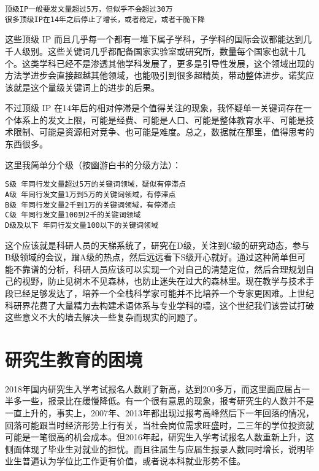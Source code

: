 \documentclass[]{tufte-book}
\begin{document}
\begin{verbatim}
顶级IP一般要发文量超过5万，但似乎不会超过30万
很多顶级IP在14年之后停止了增长，或者稳定，或者干脆下降
\end{verbatim}

这些顶级 IP 而且几乎每一个都有一堆下属子学科，子学科的国际会议都能达到几千人级别。这些关键词几乎都配备国家实验室或研究所，数量每个国家也就十几个。这类学科已经不是渗透其他学科发展了，更多是引导性发展，这个领域出现的方法学进步会直接超越其他领域，也能吸引到很多超精英，带动整体进步。诺奖应该就是这个量级关键词上的进步的后果。

不过顶级 IP 在14年后的相对停滞是个值得关注的现象，我怀疑单一关键词存在一个体系上的发文上限，可能是经费、可能是人口、可能是整体教育水平、可能是技术限制、可能是资源相对竞争、也可能是难度。总之，数据就在那里，值得思考的东西很多。

这里我简单分个级（按幽游白书的分级方法）：

\begin{verbatim}
S级 年同行发文量超过5万的关键词领域，疑似有停滞点
A级 年同行发文量1万到5万的关键词领域，有停滞点
B级 年同行发文量2千到1万的关键词领域，有停滞点
C级 年同行发文量100到2千的关键词领域
D级及以下 年同行发文量100以下的关键词领域
\end{verbatim}

这个应该就是科研人员的天梯系统了，研究在D级，关注到C级的研究动态，参与B级领域的会议，蹭A级的热点，然后远远看下S级开心就好。通过这种简单但可能不靠谱的分析，科研人员应该可以实现一个对自己的清楚定位，然后合理规划自己的视野，防止见树木不见森林，也防止迷失在过大的森林里。现在教学与技术手段已经足够发达了，培养一个全栈科学家可能并不比培养一个专家更困难。上世纪科研界花费了大量精力去构建术语体系与专业学科的墙，这个世纪我们该尝试打破这些意义不大的墙去解决一些复杂而现实的问题了。

\hypertarget{ux7814ux7a76ux751fux6559ux80b2ux7684ux56f0ux5883}{%
\section{研究生教育的困境}\label{ux7814ux7a76ux751fux6559ux80b2ux7684ux56f0ux5883}}

2018年国内研究生入学考试报名人数刷了新高，达到200多万，而这里面应届占一半多一些，报录比在缓慢降低。有一个很有意思的现象，报考研究生的人数并不是一直上升的，事实上，2007年、2013年都出现过报考高峰然后下一年回落的情况，回落可能跟当时经济形势上行有关，当社会岗位需求旺盛时，二三年的学位投资就可能是一笔很高的机会成本。但2016年起，研究生入学考试报名人数重新上升，这侧面体现了毕业生对就业的担忧。而且往届生与应届生报录人数同时增长，说明毕业生普遍认为学位比工作更有价值，或者说本科就业形势不佳。
\end{document}
